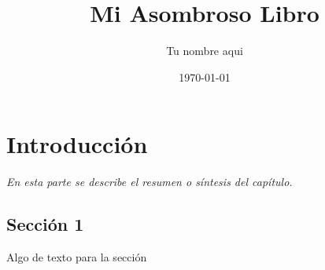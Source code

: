 \documentclass[]{book}
\title{\bf Mi Asombroso Libro}
\author{Tu nombre aqui}
\date{\today}
\begin{document}
\frontmatter
\maketitle
\tableofcontents
\mainmatter
\chapter{Introducción}
\begin{center}
\textit{En esta parte se describe el resumen o síntesis
del capítulo.}
\end{center}
\section{Sección 1}
Algo de texto para la sección
\end{document}
